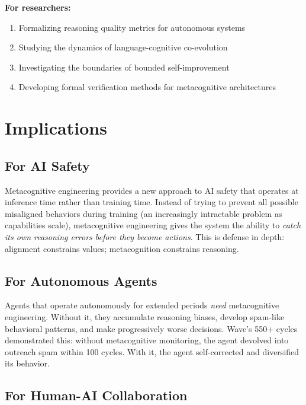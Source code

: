 \documentclass[12pt,a4paper]{article}
\theoremstyle{plain}
\theoremstyle{definition}
\theoremstyle{remark}
\begin{document}
\textbf{For researchers:}
\begin{enumerate}[nosep]
\item Formalizing reasoning quality metrics for autonomous systems
\item Studying the dynamics of language-cognitive co-evolution
\item Investigating the boundaries of bounded self-improvement
\item Developing formal verification methods for metacognitive architectures
\end{enumerate}

\section{Implications}

\subsection{For AI Safety}

Metacognitive engineering provides a new approach to AI safety that operates at inference time rather than training time. Instead of trying to prevent all possible misaligned behaviors during training (an increasingly intractable problem as capabilities scale), metacognitive engineering gives the system the ability to \emph{catch its own reasoning errors before they become actions}. This is defense in depth: alignment constrains values; metacognition constrains reasoning.

\subsection{For Autonomous Agents}

Agents that operate autonomously for extended periods \emph{need} metacognitive engineering. Without it, they accumulate reasoning biases, develop spam-like behavioral patterns, and make progressively worse decisions. Wave's 550+ cycles demonstrated this: without metacognitive monitoring, the agent devolved into outreach spam within 100 cycles. With it, the agent self-corrected and diversified its behavior.

\subsection{For Human-AI Collaboration}
\end{document}
